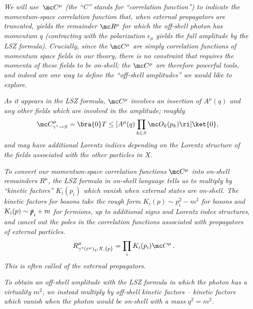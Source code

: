 \begin{adjustwidth}{20pt}{20pt}%
\textit{%
    We will use \(\,\mc C^\mu\) (the ``C'' stands for ``correlation function'') to indicate the momentum-space correlation function that, when external propagators are truncated, yields the remainder \(\mc R^\mu\) for which the off-shell photon has momentum \(q\) (contracting with the polarization \(\epsilon_\mu\) yields the full amplitude by the LSZ formula).
    Crucially, since the \(\mc C^\mu\) are simply correlation functions of momentum space fields in our theory, there is no constraint that requires the momenta of these fields to be on-shell;
    the \(\mc C^\mu\) are therefore powerful tools, and indeed are one way to \textit{define} the ``off-shell amplitudes'' we would like to explore.
    }

    \textit{%
    As it appears in the LSZ formula, \(\mc C^\mu\) involves an insertion of \(A^\mu(q)\) and any other fields which are involved in the amplitude;
    roughly}
    \begin{align}
        \mc C^\mu_{\gamma^* \to S}
        =
        \bra{0} T\le[ A^\mu(q) \prod_{k \in S} \mc O_k(p_k)\ri] \ket{0}
        ,
    \end{align}
    \textit{%
    and may have additional Lorentz indices depending on the Lorentz structure of the fields associated with the other particles in \(X\).
    }

    \textit{%
    To convert our momentum-space correlation functions \(\mc C^\mu\) into \emph{on-shell} remainders \(R^\mu\), the LSZ formula in on-shell language tells us to multiply by ``kinetic factors'' \(K_i(p_i)\) which vanish when external states are on-shell.
    The kinetic factors for bosons take the rough form \(K_i(p) \sim p_i^2 - m^2\) for bosons and \(K_i(p) \sim \slashed{p}_i + m\) for fermions, up to additional signs and Lorentz index structures, and cancel out the poles in the correlation functions associated with propagators of external particles.
    }
    \begin{align}
        R^\mu_{\gamma^*(\varepsilon^\mu)_q; X, \{p\}}
        &=
        \prod_i K_i(p_i) \mc C^\mu
        \,.
    \end{align}
    \textit{
    This is often called  of the external propagators.
    }

    \textit{%
    To obtain an off-shell amplitude with the LSZ formula in which the photon has a virtuality \(m^2\), we instead multiply by off-shell kinetic factors -- kinetic factors which vanish when the photon would be on-shell with a mass \(q^2 = m^2\).
    }



\end{adjustwidth}
